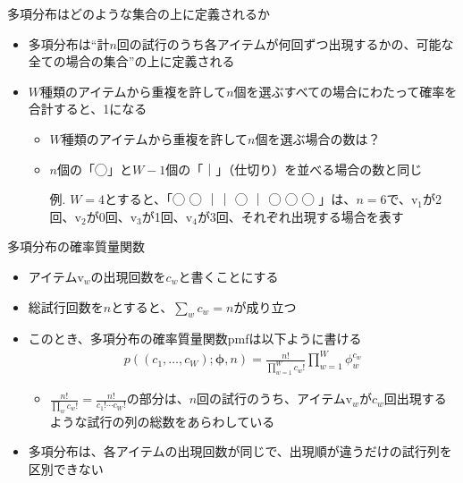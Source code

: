 \documentclass[aspectratio=169,unicode,dvipdfmx,14pt]{beamer}
\begin{document}
\begin{frame}{多項分布はどのような集合の上に定義されるか}
\begin{itemize}
\item 多項分布は``計$n$回の試行のうち各アイテムが何回ずつ出現するかの、可能な全ての場合の集合''の上に定義される
\item $W$種類のアイテムから重複を許して$n$個を選ぶすべての場合にわたって確率を合計すると、1になる
\begin{itemize}
\item $W$種類のアイテムから重複を許して$n$個を選ぶ場合の数は？
\item $n$個の「◯」と$W-1$個の「｜」（仕切り）を並べる場合の数と同じ
\item[例.] $W=4$とすると、「◯ ◯ ｜｜ ◯ ｜ ◯ ◯ ◯ 」は、$n=6$で、$\mbox{v}_1$が2回、$\mbox{v}_2$が0回、$\mbox{v}_3$が1回、$\mbox{v}_4$が3回、それぞれ出現する場合を表す
\end{itemize}
\end{itemize}
\end{frame}

\begin{frame}{多項分布の確率質量関数}
\begin{itemize}
\item アイテム$\mbox{v}_w$の出現回数を$c_w$と書くことにする
\item 総試行回数を$n$とすると、$\sum_w c_w = n$が成り立つ
\item このとき、多項分布の確率質量関数pmfは以下ように書ける
\begin{align}
p((c_1,\ldots,c_W);\bm{\phi},n) = \frac{n!}{\prod_{w=1}^W c_w!}\prod_{w=1}^W \phi_w^{c_w}
\end{align}
\begin{itemize}
\item $\frac{n!}{\prod_w c_w!} = \frac{n!}{c_1!\cdots c_W!}$の部分は、$n$回の試行のうち、アイテム$\mbox{v}_w$が$c_w$回出現するような試行の列の総数をあらわしている
\end{itemize}
\item 多項分布は、各アイテムの出現回数が同じで、出現順が違うだけの試行列を区別できない
\end{itemize}
\end{frame}
\end{document}
